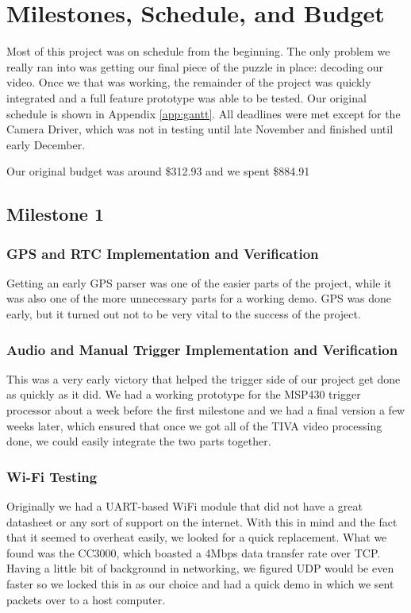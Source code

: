 \documentclass[12pt]{article}
\begin{document}
\section{Milestones, Schedule, and Budget}
Most of this project was on schedule from the beginning. The only problem we
really ran into was getting our final piece of the puzzle in place: decoding
our video. Once we that was working, the remainder of the project was quickly
integrated and a full feature prototype was able to be tested. Our original
schedule is shown in Appendix \ref{app:gantt}. All deadlines were met except
for the Camera Driver, which was not in testing until late November and
finished until early December.

Our original budget was around \$312.93 and we spent \$884.91 %

\subsection{Milestone 1}
\subsubsection{GPS and RTC Implementation and Verification}
Getting an early GPS parser was one of the easier parts of the project, while
it was also one of the more unnecessary parts for a working demo. GPS was done
early, but it turned out not to be very vital to the success of the project.

\subsubsection{Audio and Manual Trigger Implementation and Verification}
This was a very early victory that helped the trigger side of our project get
done as quickly as it did. We had a working prototype for the MSP430 trigger
processor about a week before the first milestone and we had a final version a
few weeks later, which ensured that once we got all of the TIVA video
processing done, we could easily integrate the two parts together.

\subsubsection{Wi-Fi Testing}
Originally we had a UART-based WiFi module that did not have a great datasheet
or any sort of support on the internet. With this in mind and the fact that it
seemed to overheat easily, we looked for a quick replacement. What we found was
the CC3000, which boasted a 4Mbps data transfer rate over TCP. Having a little
bit of background in networking, we figured UDP would be even faster so we
locked this in as our choice and had a quick demo in which we sent packets over
to a host computer.
\end{document}
